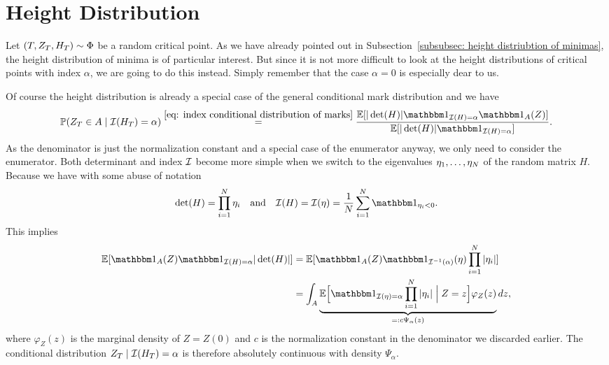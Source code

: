 \section{Height Distribution}
\label{sec: height distribution}

Let \((T,Z_T,H_T)\sim\Phi\) be a random critical point. As we have
already pointed out in Subsection~\ref{subsubsec: height distriubtion of minimas},
the height distribution of minima is of particular interest. But since it is
not more difficult to look at the height distributions of critical points with
index \(\alpha\), we are going to do this instead. Simply remember that the
case \(\alpha=0\) is especially dear to us.

Of course the height distribution is already a special case of the general
conditional mark distribution and we have
\[
	\Pr(\rf_T \in A \mid \negEV(H_T) = \alpha)
	\overset{\eqref{eq: index conditional distribution of marks}}=
	\frac{
		\E[|\det(H)|\ind_{\negEV(H)=\alpha}\ind_A(Z)]
	}{
		\E[|\det(H)|\ind_{\negEV(H)=\alpha}]
	}.
\]
As the denominator is just the normalization constant and a special case
of the enumerator anyway, we only need to consider the enumerator.
Both determinant and index \(\mathcal{I}\) become more simple when we
switch to the eigenvalues \(\eta_1,\dots,\eta_N\) of the random matrix
\(H\). Because we have
with some abuse of notation
\[
	\det(H) = \prod_{i=1}^\dims \evH_i
	\quad\text{and}\quad
	\negEV(H) = \negEV(\evH)
	= \frac1\dims \sum_{i=1}^\dims \ind_{\evH_i < 0}.
\]
This implies
\[\begin{aligned}
	\E[\ind_{A}(Z)\ind_{\negEV(H) = \alpha}|\det(H)|]
	&= \E[\ind_{A}(Z)
	\ind_{\negEV^{-1}(\alpha)}(\evH)\prod_{i=1}^\dims |\evH_i|]\\
	&= \int_A \underbrace{
		\E\Big[
			\ind_{\negEV(\evH) = \alpha}\prod_{i=1}^\dims |\evH_i|
			\Bigm| Z=z
		\Big]
		\varphi_Z(z)
	}_{=:c\Psi_\alpha(z)}
	dz,
\end{aligned}\]
where \(\varphi_Z(z)\) is the marginal density of \(Z=Z(0)\) and \(c\) is the
normalization constant in the denominator we discarded earlier.
The conditional distribution \(Z_T \mid \mathcal{I}(H_T) = \alpha\) is therefore
absolutely continuous with density \(\Psi_\alpha\).

